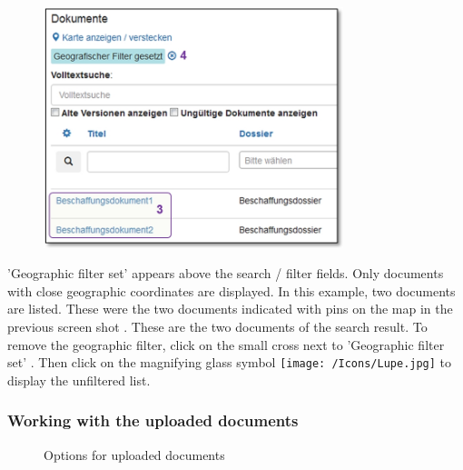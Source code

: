 \vspace{1cm} 

\begin{figure}
  \vspace{-25pt} 
  \begin{center}
    \includegraphics[height=70mm]{../chapters/11_Dokumentenablage/pictures/11-2-3_GeoBereichResult.jpg}
  \end{center}
  \vspace{-20pt}
  \vspace{-10pt}
\end{figure}
'Geographic filter set' appears above the search / filter fields. Only documents with close geographic coordinates are displayed. In this example, two documents are listed. These were the two documents indicated with pins on the map in the previous screen shot . These are the two documents of the search result. To remove the geographic filter, click on the small cross next to 'Geographic filter set' . Then click on the magnifying glass symbol \texttt{[image: /Icons/Lupe.jpg]} to display the unfiltered list.

\subsubsection{Working with the uploaded documents}
\label{bkm:Ref442801819}

\begin{figure}[H]
\caption{Options for uploaded documents}
\end{figure}


